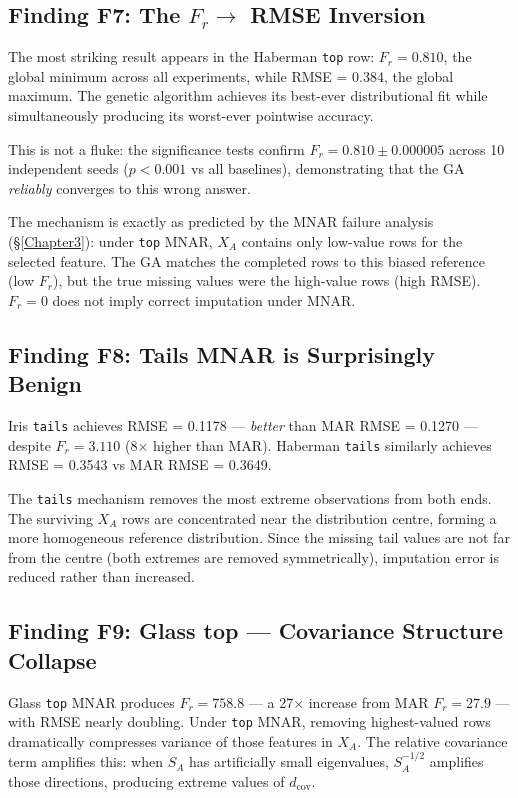 \subsection{Finding F7: The $F_r \rightarrow$ RMSE Inversion}

The most striking result appears in the Haberman \texttt{top} row: $F_r = 0.810$, the global minimum across all experiments, while RMSE = 0.384, the global maximum. The genetic algorithm achieves its best-ever distributional fit while simultaneously producing its worst-ever pointwise accuracy.

This is not a fluke: the significance tests confirm $F_r = 0.810 \pm 0.000005$ across 10 independent seeds ($p < 0.001$ vs all baselines), demonstrating that the GA \emph{reliably} converges to this wrong answer.

The mechanism is exactly as predicted by the MNAR failure analysis (\S\ref{Chapter3}): under \texttt{top} MNAR, $X_A$ contains only low-value rows for the selected feature. The GA matches the completed rows to this biased reference (low $F_r$), but the true missing values were the high-value rows (high RMSE). $F_r = 0$ does not imply correct imputation under MNAR.

\subsection{Finding F8: Tails MNAR is Surprisingly Benign}

Iris \texttt{tails} achieves RMSE = 0.1178 --- \emph{better} than MAR RMSE = 0.1270 --- despite $F_r = 3.110$ (8$\times$ higher than MAR). Haberman \texttt{tails} similarly achieves RMSE = 0.3543 vs MAR RMSE = 0.3649.

The \texttt{tails} mechanism removes the most extreme observations from both ends. The surviving $X_A$ rows are concentrated near the distribution centre, forming a more homogeneous reference distribution. Since the missing tail values are not far from the centre (both extremes are removed symmetrically), imputation error is reduced rather than increased.

\subsection{Finding F9: Glass top --- Covariance Structure Collapse}

Glass \texttt{top} MNAR produces $F_r = 758.8$ --- a 27$\times$ increase from MAR $F_r = 27.9$ --- with RMSE nearly doubling. Under \texttt{top} MNAR, removing highest-valued rows dramatically compresses variance of those features in $X_A$. The relative covariance term amplifies this: when $S_A$ has artificially small eigenvalues, $S_A^{-1/2}$ amplifies those directions, producing extreme values of $d_{\text{cov}}$.

